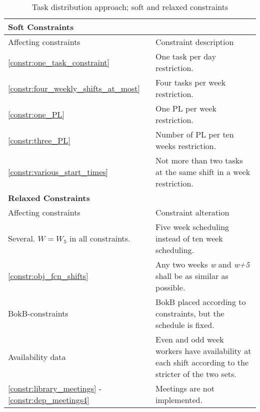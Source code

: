 \begin{table}[!h]
\centering
\caption{Task distribution approach; soft and relaxed constraints}
\label{tab:task_constraints}
\begin{tabular}{|p{4cm}|p{7cm}|}
\hline
\multicolumn{2}{|l|}{\cellcolor{gray!90} \textbf{Soft Constraints}} \\
\hline 
\rowcolor{Gray} Affecting constraints & Constraint description \\ \hline
\ref{constr:one_task_constraint} & One task per day restriction.  \\ \hline
\ref{constr:four_weekly_shifts_at_most} & Four tasks per week restriction. \\ \hline
\ref{constr:one_PL} & One PL per week restriction. \\ \hline
\ref{constr:three_PL} & Number of PL per ten weeks restriction. \\ \hline
\ref{constr:various_start_times} & Not more than two tasks at the same shift in a week restriction.  \\ \hline
\multicolumn{2}{|l|}{\cellcolor{gray!90} \textbf{Relaxed Constraints}} \\
\hline 
\rowcolor{Gray} Affecting constraints & Constraint alteration \\ \hline
Several. $W = W_5$ in all constraints. & Five week scheduling instead of ten week scheduling. \\ \hline
\ref{constr:obj_fcn_shifts} & Any two weeks \textit{w} and \textit{w+5} shall be as similar as possible. \\ \hline
BokB-constraints & BokB placed according to constraints, but the schedule is fixed. \\ \hline
Availability data & Even and odd week workers have availability at each shift according to the stricter of the two sets. \\ \hline
\ref{constr:library_meetings} - \ref{constr:dep_meetings4} & Meetings are not implemented. \\ \hline
\end{tabular}
\end{table}
